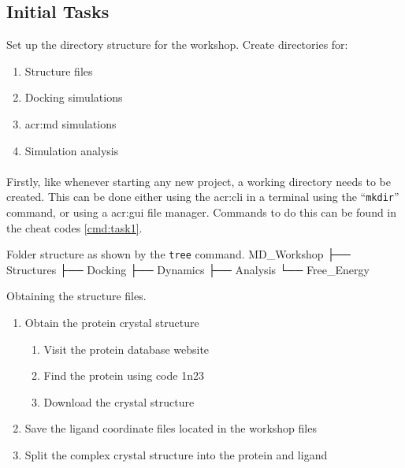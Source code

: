 \subsection{Initial Tasks}
    \begin{task}[label=task:setup]{Set up the directory structure for the workshop.}
    Create directories for:
        \begin{enumerate}[label=(\alph*)]
            \item Structure files
            \item Docking simulations
            \item \gls{acr:md} simulations
            \item Simulation analysis
        \end{enumerate}
    \end{task}

    \paragraph{}
    Firstly, like whenever starting any new project, a working directory needs to be created. This can be done either using the \gls{acr:cli} in a terminal using the \enquote{\texttt{mkdir}} command, or using a \gls{acr:gui} file manager. Commands to do this can be found in the cheat codes \cref{cmd:task1}.

\begin{bashoutput}[label=listing:folders]{Folder structure as shown by the \texttt{tree} command.}
    MD_Workshop
    ├── Structures
    ├── Docking
    ├── Dynamics
    ├── Analysis
    └── Free_Energy
\end{bashoutput}
    
    \begin{task}[label=task:Structures]{Obtaining the structure files.}
    \begin{enumerate}[label=(\alph*)]
        \item Obtain the protein crystal structure
        \begin{enumerate}[label=(\roman*)]
            \item Visit the protein database website
            \item Find the protein using code 1n23
            \item Download the crystal structure
        \end{enumerate}
        \item Save the ligand coordinate files located in the workshop files
        \item Split the complex crystal structure into the protein and ligand
    \end{enumerate}
  \end{task}

